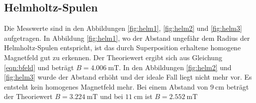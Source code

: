 \subsection{Helmholtz-Spulen \label{sec:helm}}

Die Messwerte sind in den Abbildungen \ref{fig:helm1}, \ref{fig:helm2} und \ref{fig:helm3} aufgetragen.
In Abbildung \ref{fig:helm1}, wo der Abstand ungefähr dem Radius der Helmholtz-Spulen entspricht,
ist das durch Superposition erhaltene homogene Magnetfeld gut zu erkennen.
Der Theoriewert ergibt sich aus Gleichung \eqref{eqn:bfeld} und beträgt $B = \SI{4,006}{\milli \tesla}$.
In den Abbildungen \ref{fig:helm2} und \ref{fig:helm3} wurde der Abstand erhöht und der ideale Fall liegt nicht
mehr vor. Es entsteht kein homogenes Magnetfeld mehr.
Bei einem Abstand von $\SI{9}{\centi \meter}$ beträgt der Theoriewert $B = \SI{3,224}{\milli \tesla}$ und bei
$\SI{11}{\centi \meter}$ ist $B = \SI{2,552}{\milli \tesla}$

